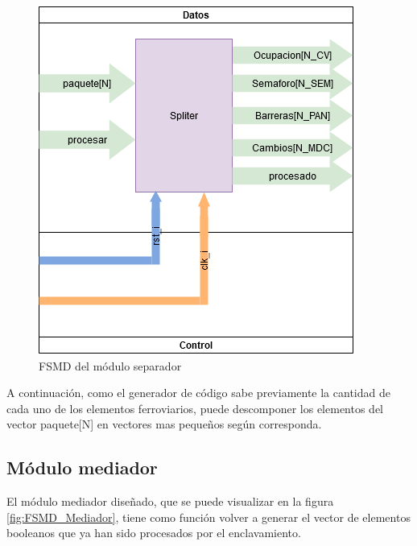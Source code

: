 		\begin{figure}[h]
		\centering
			\includegraphics[scale=.5]{./Figures/FSMD-Separador}
			\caption{FSMD del módulo separador}
			\label{fig:FSMD_Separador}
		\end{figure}
		
		\vspace{5cm}
		
		A continuación, como el generador de código sabe previamente la cantidad de cada uno de los elementos ferroviarios, puede descomponer los elementos del vector paquete[N] en vectores mas pequeños según corresponda.
		
	\subsection{Módulo mediador}
	
		El módulo mediador diseñado, que se puede visualizar en la figura \ref{fig:FSMD_Mediador}, tiene como función volver a generar el vector de elementos booleanos que ya han sido procesados por el enclavamiento.
		
